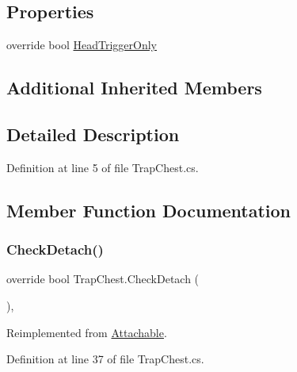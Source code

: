 \subsection*{Properties}
\begin{DoxyCompactItemize}
\item 
override bool \mbox{\hyperlink{class_trap_chest_abb4524fa9580faa05a738aff2ad4659e}{Head\+Trigger\+Only}}
\end{DoxyCompactItemize}
\subsection*{Additional Inherited Members}


\subsection{Detailed Description}


Definition at line 5 of file Trap\+Chest.\+cs.



\subsection{Member Function Documentation}
\mbox{\label{class_trap_chest_ab8f0424386ce3ac8f7e0a08bd503c4f5}} 
\subsubsection{\texorpdfstring{Check\+Detach()}{CheckDetach()}}
{\footnotesize\ttfamily override bool Trap\+Chest.\+Check\+Detach (\begin{DoxyParamCaption}{ }\end{DoxyParamCaption})\hspace{0.3cm}{\ttfamily [protected]}, {\ttfamily [virtual]}}



Reimplemented from \mbox{\hyperlink{class_attachable_a5cd6ea1bf16c527c033e6f09681f84f8}{Attachable}}.



Definition at line 37 of file Trap\+Chest.\+cs.

\mbox{\label{class_trap_chest_afe04e422ad7c45f5de0509504412c3dc}} 
